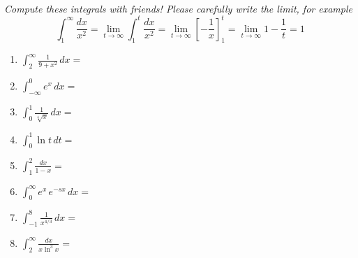 \documentclass[11pt,fleqn]{article}
\newcommand{\ds}{\displaystyle}
\begin{document}
\renewcommand{\headrulewidth}{0pt}
\newcommand{\blank}[1]{\rule{#1}{0.75pt}}
\newcommand{\bc}{\begin{center}}
\newcommand{\ec}{\end{center}}


\vspace*{-0.7in}

\begin{center}
  \large
  \\
   
\end{center}


\emph{Compute these integrals with friends!  Please carefully write the limit, for example}
    $$\int_1^\infty \frac{dx}{x^2} = \lim_{t\to \infty} \int_1^t \frac{dx}{x^2} = \lim_{t\to \infty} \left[-\frac{1}{x}\right]_1^t = \lim_{t\to \infty} 1 - \frac{1}{t} = 1$$



\begin{enumerate}
\item  $\ds \int_2^\infty \frac{1}{9+x^2}\,dx =$
\vfill

\item  $\ds \int_{-\infty}^0 e^x\,dx =$
\vfill

\item   $\ds \int_0^1 \frac{1}{\sqrt[4]{x}}\,dx =$
\vfill

\item   $\ds \int_0^1 \ln t\,dt =$
\vfill

\clearpage\newpage
\item  $\ds \int_1^2 \frac{dx}{1-x} =$
\vfill

\item   $\ds \int_0^\infty e^x \,e^{-s x}\,dx =$
\vfill

\item   $\ds \int_{-1}^8 \frac{1}{x^{4/3}}\,dx =$
\vfill

\item   $\ds \int_2^\infty \frac{dx}{x \ln^3 x} =$
\vspace{3.0in}
\end{enumerate}
\end{document}
